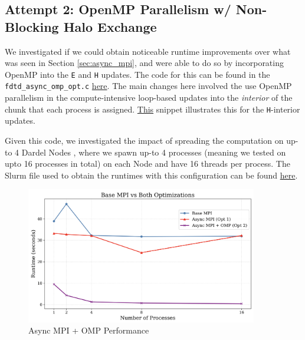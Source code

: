 \documentclass[a4paper,10pt]{article}
\begin{document}
\subsection{Attempt 2: OpenMP Parallelism w/ Non-Blocking Halo Exchange}
We investigated if we could obtain noticeable runtime improvements over what was seen in Section \ref{sec:async_mpi}, and were able to do so by incorporating OpenMP into the \verb|E| and \verb|H| updates. The code for this can be found in the \verb|fdtd_async_omp_opt.c| \href{https://github.com/paulmyr/DD2356-MethodsHPC/blob/master/5_project/4_opt/fdtd_async_omp_opt.c}{here}. The main changes here involved the use OpenMP parallelism in the compute-intensive loop-based updates into the \textit{interior} of the chunk that each process is assigned. \href{https://github.com/paulmyr/DD2356-MethodsHPC/blob/master/5_project/4_opt/fdtd_async_omp_opt.c#L61}{This} snippet illustrates this for the \verb|H|-interior updates. 

Given this code, we investigated the impact of spreading the computation on up-to 4 Dardel Nodes , where we spawn up-to 4 processes (meaning we tested on upto 16 processes in total) on each Node and have 16 threads per process. The Slurm file used to obtain the runtimes with this configuration can be found \href{https://github.com/paulmyr/DD2356-MethodsHPC/blob/master/5_project/4_opt/run_async_omp_opt.sh}{here}. 

\begin{figure}[H]
  \centering
  \includegraphics[width=0.9\textwidth]{../images/4_opt/opt_all.png}
  \caption{Async MPI + OMP Performance}
   \label{fig:4_opt_all}
\end{figure}
\end{document}
